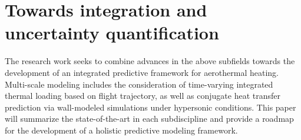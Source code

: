\documentclass [11pt, fancyhdr, twoside] {article}
\begin{document}
\section{Towards integration and uncertainty quantification}
The research work seeks to combine advances in the above subfields towards the development of an integrated predictive framework for aerothermal heating. Multi-scale modeling includes the consideration of time-varying integrated thermal loading based on flight trajectory, as well as conjugate heat transfer prediction via wall-modeled simulations under hypersonic conditions. This paper will summarize the state-of-the-art in each subdiscipline and provide a roadmap for the development of a holistic predictive modeling framework.





\end{document}
